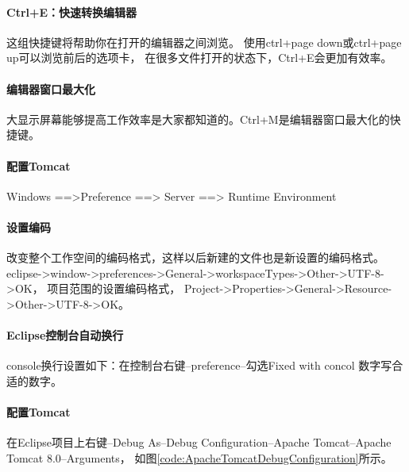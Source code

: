 \documentclass{book}
\begin{document}
\paragraph{Ctrl+E：快速转换编辑器}

这组快捷键将帮助你在打开的编辑器之间浏览。
使用ctrl+page down或ctrl+page up可以浏览前后的选项卡，
在很多文件打开的状态下，Ctrl+E会更加有效率。

\paragraph{编辑器窗口最大化}
大显示屏幕能够提高工作效率是大家都知道的。Ctrl+M是编辑器窗口最大化的快捷键。

\paragraph{配置Tomcat}
Windows ==>Preference ==> Server ==> Runtime Environment

\paragraph{设置编码}

改变整个工作空间的编码格式，这样以后新建的文件也是新设置的编码格式。
eclipse->window->preferences->General->workspaceTypes->Other->UTF-8->OK，
项目范围的设置编码格式，
Project->Properties->General->Resource->Other->UTF-8->OK。

\paragraph{Eclipse控制台自动换行}

console换行设置如下：在控制台右键--preference--勾选Fixed with concol 数字写合适的数字。

\paragraph{配置Tomcat}

在Eclipse项目上右键--Debug As--Debug Configuration--Apache Tomcat--Apache Tomcat 8.0--Arguments，
如图\ref{code:ApacheTomcatDebugConfiguration}所示。
\end{document}
